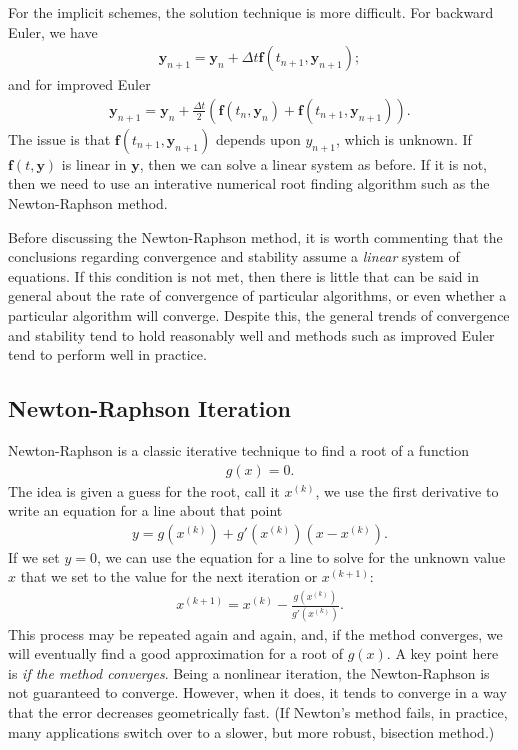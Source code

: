 For the implicit schemes, the solution technique is more difficult. For backward Euler, we have
\begin{align}
  \mathbf{y}_{n+1} = \mathbf{y}_n + \Delta t \mathbf{f}( t_{n+1}, \mathbf{y}_{n+1} ) ;
\end{align}
and for improved Euler
\begin{align}
  \mathbf{y}_{n+1} = \mathbf{y}_n + \frac{\Delta t}{2} \left( \mathbf{f}( t_n, \mathbf{y}_n ) + \mathbf{f}( t_{n+1}, \mathbf{y}_{n+1} ) \right) .
\end{align}
The issue is that $\mathbf{f}( t_{n+1}, \mathbf{y}_{n+1} )$ depends upon $y_{n+1}$, which is unknown. If $\mathbf{f}( t, \mathbf{y} )$ is linear in $\mathbf{y}$, then we can solve a linear system as before. If it is not, then we need to use an interative numerical root finding algorithm such as the Newton-Raphson method.

Before discussing the Newton-Raphson method, it is worth commenting that the conclusions regarding convergence and stability assume a \emph{linear} system of equations. If this condition is not met, then there is little that can be said in general about the rate of convergence of particular algorithms, or even whether a particular algorithm will converge. Despite this, the general trends of convergence and stability tend to hold reasonably well and methods such as improved Euler tend to perform well in practice. 


\subsection{Newton-Raphson Iteration}

Newton-Raphson is a classic iterative technique to find a root of a function
\begin{align}
  g(x) = 0. \nonumber
\end{align}
The idea is given a guess for the root, call it $x^{(k)}$, we use the first derivative to write an equation for a line about that point
\begin{align}
  y = g(x^{(k)}) + g'(x^{(k)}) ( x - x^{(k)} ).
\end{align}
If we set $y = 0$, we can use the equation for a line to solve for the unknown value $x$ that we set to the value for the next iteration or $x^{(k+1)}$:
\begin{align}
  x^{(k+1)} = x^{(k)} - \frac{ g(x^{(k)}) }{ g'(x^{(k)}) }.
\end{align}
This process may be repeated again and again, and, if the method converges, we will eventually find a good approximation for a root of $g(x)$. A key point here is \emph{if the method converges}. Being a nonlinear iteration, the Newton-Raphson is not guaranteed to converge. However, when it does, it tends to converge in a way that the error decreases geometrically fast. (If Newton's method fails, in practice, many applications switch over to a slower, but more robust, bisection method.)

